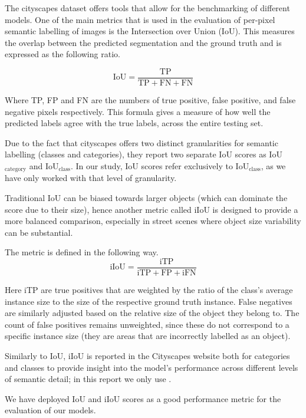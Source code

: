 The cityscapes dataset offers tools that allow for the benchmarking of different models. One of the main metrics that is used in the evaluation of per-pixel semantic labelling of images is the Intersection over Union (IoU). This measures the overlap between the predicted segmentation and the ground truth and is expressed as the following ratio.

\begin{equation*}
	\text{IoU} = \frac{\text{TP}}{\text{TP} + \text{FN} + \text{FN}}
\end{equation*}

Where TP, FP and FN are the numbers of true positive, false positive, and false negative pixels respectively.
This formula gives a measure of how well the predicted labels agree with the true labels, across the entire testing set.

Due to the fact that cityscapes offers two distinct granularities for semantic labelling (classes and categories), they report two separate IoU scores as IoU$_\text{category}$ and IoU$_\text{class}$. In our study, IoU scores refer exclusively to IoU$_\text{class}$, as we have only worked with that level of granularity.

Traditional IoU can be biased towards larger objects (which can dominate the score due to their size), hence another metric called iIoU is designed to provide a more balanced comparison, especially in street scenes where object size variability can be substantial.

The metric is defined in the following way.
\begin{equation*}
	\text{iIoU} = \frac{\text{iTP}}{\text{iTP} + \text{FP} + \text{iFN}}	
\end{equation*}

Here iTP are true positives that are weighted by the ratio of the class's average instance size to the size of the respective ground truth instance. False negatives are similarly adjusted based on the relative size of the object they belong to. The count of false positives remains unweighted, since these do not correspond to a specific instance size (they are areas that are incorrectly labelled as an object).

Similarly to IoU, iIoU is reported in the Cityscapes website both for categories and classes to provide insight into the model's performance across different levels of semantic detail; in this report we only use \iiouc{}.

We have deployed IoU and iIoU scores as a good performance metric for the evaluation of our models. 

